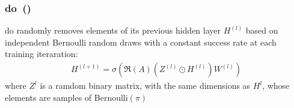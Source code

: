 


\subsubsection{\acl*{do}~(\citeauthor{Srivastava2014})}
\label{sec:related:pred:regularization:do}

\ac{do} randomly removes elements of its previous hidden
layer $H^{(l)}$ based on independent Bernoulli random draws with a constant success rate at each
training iteraration:
\begin{align*}
    H^{(l+1)} = \sigma(\mathfrak{R}(A)(Z^{(l)}\odot H^{(l)}) W^{(l)})
\end{align*}
where $Z^{l}$ is a ramdom binary matrix, with the same dimensions as $H^{l}$, whose
elements are samples of Bernoulli$(\pi)$

